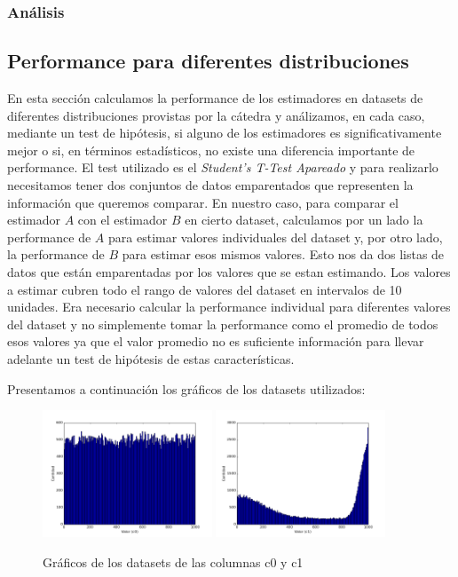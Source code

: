  \subsubsection*{Análisis}


\subsection{Performance para diferentes distribuciones}
En esta sección calculamos la performance de los estimadores en datasets de diferentes distribuciones provistas por la cátedra y análizamos, en cada caso, mediante un test de hipótesis, si alguno de los estimadores es significativamente mejor o si, en términos estadísticos, no existe una diferencia importante de performance. 
El test utilizado es el \textit{Student’s T-Test Apareado} y para realizarlo necesitamos tener dos conjuntos de datos emparentados que representen la información que queremos comparar. En nuestro caso, para comparar el estimador $A$ con el estimador $B$ en cierto dataset, calculamos por un lado la performance de $A$ para estimar valores individuales del dataset y, por otro lado, la performance de $B$ para estimar esos mismos valores. Esto nos da dos listas de datos que están emparentadas por los valores que se estan estimando. Los valores a estimar cubren todo el rango de valores del dataset en intervalos de 10 unidades. Era necesario calcular la performance individual para diferentes valores del dataset y no simplemente tomar la performance como el promedio de todos esos valores ya que el valor promedio no es suficiente información para llevar adelante un test de hipótesis de estas características.

Presentamos a continuación los gráficos de los datasets utilizados:

\begin{figure}[h!]
  \centering
  \includegraphics[width=0.45\textwidth]{./../source/datasets/img/c0}
  \includegraphics[width=0.45\textwidth]{./../source/datasets/img/c1}
  \caption{Gráficos de los datasets de las columnas c0 y c1}
 \end{figure}
 
